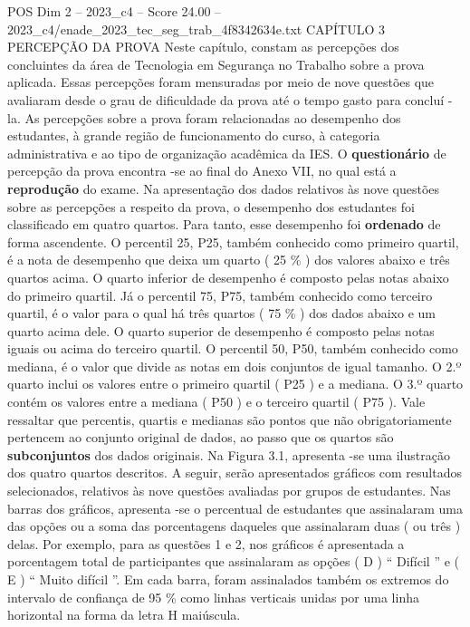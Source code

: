 \begin{textsample}{POS Dim 2 – 2023\_c4 – Score 24.00 – 2023\_c4/enade\_2023\_tec\_seg\_trab\_4f8342634e.txt}  \label{ex:f2_pos_015}
CAPÍTULO 3 PERCEPÇÃO DA PROVA Neste capítulo, constam as percepções dos concluintes da área de Tecnologia em Segurança no Trabalho sobre a prova aplicada.
Essas percepções foram mensuradas por meio de nove questões que avaliaram desde o grau de dificuldade da prova até o tempo gasto para concluí -la.
As percepções sobre a prova foram relacionadas ao desempenho dos estudantes, à grande região de funcionamento do curso, à categoria administrativa e ao tipo de organização acadêmica da IES.
O \textbf{questionário} de percepção da prova encontra -se ao final do Anexo VII, no qual está a \textbf{reprodução} do exame.
Na apresentação dos dados relativos às nove questões sobre as percepções a respeito da prova, o desempenho dos estudantes foi classificado em quatro quartos.
Para tanto, esse desempenho foi \textbf{ordenado} de forma ascendente.
O percentil 25, P25, também conhecido como primeiro quartil, é a nota de desempenho que deixa um quarto ( 25 \% ) dos valores abaixo e três quartos acima.
O quarto inferior de desempenho é composto pelas notas abaixo do primeiro quartil.
Já o percentil 75, P75, também conhecido como terceiro quartil, é o valor para o qual há três quartos ( 75 \% ) dos dados abaixo e um quarto acima dele.
O quarto superior de desempenho é composto pelas notas iguais ou acima do terceiro quartil.
O percentil 50, P50, também conhecido como mediana, é o valor que divide as notas em dois conjuntos de igual tamanho.
O 2.º quarto inclui os valores entre o primeiro quartil ( P25 ) e a mediana.
O 3.º quarto contém os valores entre a mediana ( P50 ) e o terceiro quartil ( P75 ).
Vale ressaltar que percentis, quartis e medianas são pontos que não obrigatoriamente pertencem ao conjunto original de dados, ao passo que os quartos são \textbf{subconjuntos} dos dados originais.
Na Figura 3.1, apresenta -se uma ilustração dos quatro quartos descritos.
A seguir, serão apresentados gráficos com resultados selecionados, relativos às nove questões avaliadas por grupos de estudantes.
Nas barras dos gráficos, apresenta -se o percentual de estudantes que assinalaram uma das opções ou a soma das porcentagens daqueles que assinalaram duas ( ou três ) delas.
Por exemplo, para as questões 1 e 2, nos gráficos é apresentada a porcentagem total de participantes que assinalaram as opções ( D ) “ Difícil ” e ( E ) “ Muito difícil ”.
Em cada barra, foram assinalados também os extremos do intervalo de confiança de 95 \% como linhas verticais unidas por uma linha horizontal na forma da letra H maiúscula.

\end{textsample}

